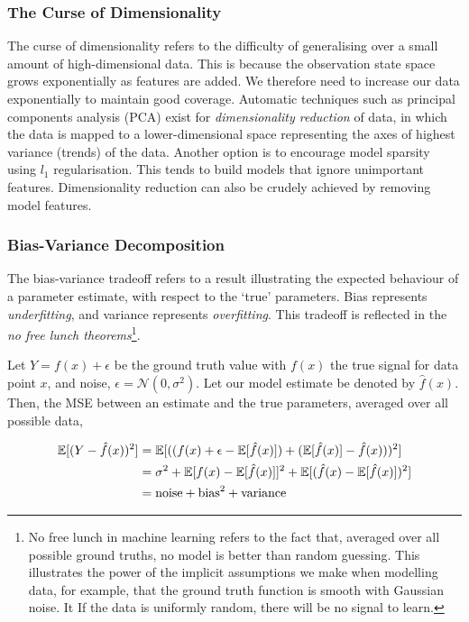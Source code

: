 \documentclass[11pt]{amsart}
\begin{document}
\subsubsection{The Curse of Dimensionality}
The curse of dimensionality refers to the difficulty of generalising over a small amount of high-dimensional data. This is because the observation state space grows exponentially as features are added. We therefore need to increase our data exponentially to maintain good coverage. Automatic techniques such as principal components analysis (PCA) exist for \emph{dimensionality reduction} of data, in which the data is mapped to a lower-dimensional space representing the axes of highest variance (trends) of the data. Another option is to encourage model sparsity using $l_1$ regularisation. This tends to build models that ignore unimportant features. Dimensionality reduction can also be crudely achieved by removing model features.

\subsubsection{Bias-Variance Decomposition}
The bias-variance tradeoff refers to a result illustrating the expected behaviour of a parameter estimate, with respect to the `true' parameters. Bias represents \emph{underfitting}, and variance represents \emph{overfitting}. This tradeoff is reflected in the \emph{no free lunch theorems}\footnote{No free lunch in machine learning refers to the fact that, averaged over all possible ground truths, no model is better than random guessing. This illustrates the power of the implicit assumptions we make when modelling data, for example, that the ground truth function is smooth with Gaussian noise. It  If the data is uniformly random, there will be no signal to learn.}.

 Let $Y = f(x) + \epsilon$ be the ground truth value with $f(x)$ the true signal for data point $x$, and noise, $\epsilon = \mathcal{N}(0, \sigma^2)$. Let our model estimate be denoted by $\hat{f}(x)$. Then, the MSE between an estimate and the true parameters, averaged over all possible data,

\begin{align}
\mathbb{E}[(Y - \hat{f}(x))^2] &= \mathbb{E}[((f(x) + \epsilon - \mathbb{E}[\hat{f}(x)]) + (\mathbb{E}[\hat{f}(x)] - \hat{f}(x)))^2] \notag \\
&= \sigma^2 + \mathbb{E}[f(x) - \mathbb{E}[\hat{f}(x)]]^2 + \mathbb{E}[(\hat{f}(x) - \mathbb{E}[\hat{f}(x)])^2] \notag \\
&= \text{noise} + \text{bias}^2 + \text{variance} \notag
\end{align}
\end{document}
